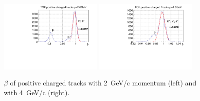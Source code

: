 \begin{figure}[tbp]
\begin{center}
\includegraphics[width=0.45\textwidth]{figures/TOF_postracks_2000mev.pdf}
\includegraphics[width=0.45\textwidth]{figures/TOF_postracks_4000mev.pdf}
\caption{\label{fig:betaproj}$\beta$ of positive charged tracks with 2~GeV/c momentum (left) and with 4~GeV/c (right).}
\end{center}
\end{figure}
